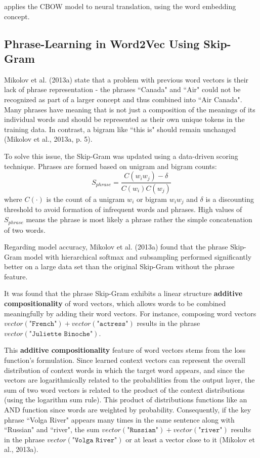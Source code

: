  applies the CBOW model to neural translation, using the word embedding concept. 

\subsection{Phrase-Learning in Word2Vec Using Skip-Gram}

Mikolov et al. (2013a) state that a problem with previous word vectors is their lack of phrase representation - the phrases ``Canada" and ``Air" could not be recognized as part of a larger concept and thus combined into ``Air Canada". Many phrases have meaning that is not just a composition of the meanings of its individual words and should be represented as their own unique tokens in the training data. In contrast, a bigram like ``this is" should remain unchanged (Mikolov et al., 2013a, p. 5). 

To solve this issue, the Skip-Gram was updated using a data-driven scoring technique. Phrases are formed based on unigram and bigram counts: 
$$
S_{phrase} = \frac{C(w_i w_j) - \delta} {C(w_i)C(w_j)}
$$
where $C(\cdot)$ is the count of a unigram $w_i$ or bigram $w_i w_j$ and $\delta$ is a discounting threshold to avoid formation of infrequent words and phrases. High values of $S_{phrase}$ means the phrase is most likely a phrase rather the simple concatenation of two words. 

Regarding model accuracy, Mikolov et al. (2013a) found that the phrase Skip-Gram model with hierarchical softmax and subsampling performed significantly better on a large data set than the original Skip-Gram without the phrase feature. 

It was found that the phrase Skip-Gram exhibits a linear structure \textbf{additive compositionality} of word vectors, which allows words to be combined meaningfully by adding their word vectors. For instance, composing word vectors $vector(\texttt{"French"}) \! + \! vector(\texttt{"actress"})$ results in the phrase $vector(\texttt{"Juliette Binoche"})$. 

This \textbf{additive compositionality} feature of word vectors stems from the loss function's formulation. Since learned context vectors can represent the overall distribution of context words in which the target word appears, and since the vectors are logarithmically related to the probabilities from the output layer, the sum of two word vectors is related to the product of the context distributions (using the logarithm sum rule). This product of distributions functions like an AND function since words are weighted by probability. Consequently, if the key phrase ``Volga River" appears many times in the same sentence along with ``Russian" and ``river", the sum $vector(\texttt{"Russian"}) \! + \! vector(\texttt{"river"})$ results in the phrase $vector(\texttt{"Volga River"})$ or at least a vector close to it (Mikolov et al., 2013a). 
